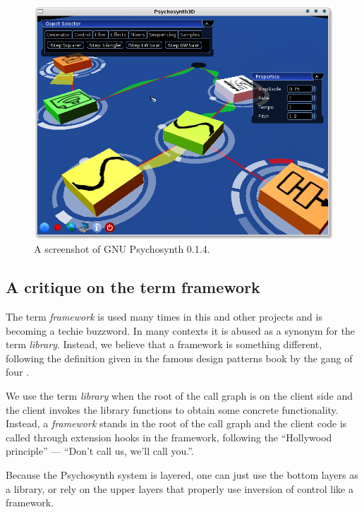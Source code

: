 \begin{figure}[h!]
  \centering
  \includegraphics[width=\textwidth]{pic/screenie.png}
  \caption[A screenshot of GNU Psychosynth 0.1.4]{A screenshot of GNU
    Psychosynth 0.1.4.}
  \label{fig:screenie}
\end{figure}

\subsection{A critique on the term framework}

The term \emph{framework} is used many times in this
and other projects and is becoming a techie buzzword. In many contexts
it is abused as a synonym for the term
\emph{library}. Instead, we believe that a framework is
something different, following the definition given in the famous
design patterns book by the gang of four \cite{gamma95design}.

We use the term \emph{library} when the root of the call graph is on
the client side and the client invokes the library functions to obtain
some concrete functionality. Instead, a \emph{framework} stands in the
root of the call graph and the client code is called through extension
hooks in the framework, following the ``Hollywood
principle'' --- ``Don't call us, we'll call
you.''.

Because the Psychosynth system is layered, one can just use the bottom
layers as a library, or rely on the upper layers that properly use
inversion of control like a framework.

